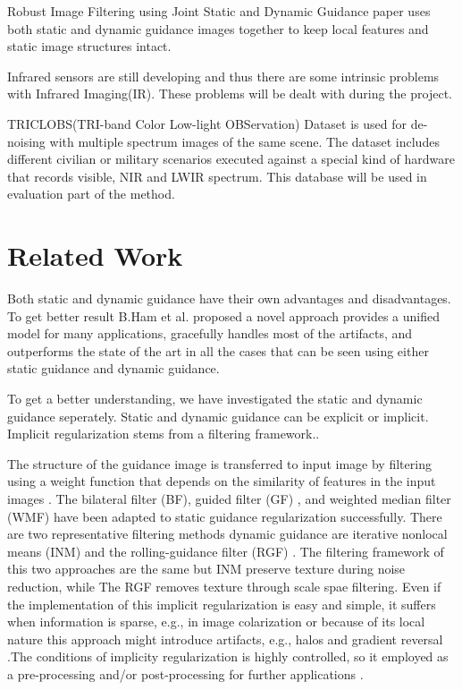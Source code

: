 \documentclass[10pt,twocolumn,letterpaper]{article}
\begin{document}
Robust Image Filtering using Joint Static and Dynamic Guidance\cite{ham2015} paper uses both static and dynamic guidance images together to keep local features and static image structures intact.

Infrared sensors are still developing and thus there are some intrinsic problems with Infrared Imaging(IR). These problems will be dealt with during the project.

TRICLOBS(TRI-band Color Low-light OBServation) Dataset\cite{triclobs} is used for de-noising with multiple spectrum images of the same scene. The dataset includes different civilian or military scenarios executed against a special kind of hardware that records visible, NIR and LWIR spectrum. This database will be used in evaluation part of the method\cite{ham2015}.

\section{Related Work}
Both static and dynamic guidance have their own advantages and disadvantages. To get better result B.Ham et al.\cite{ham2015} proposed a novel approach provides a unified model for many applications, gracefully handles most of the artifacts, and outperforms the state of the art in all the cases that can be seen using either static guidance and dynamic guidance.

To get a better understanding, we have investigated\textsl{} the static and dynamic guidance seperately. Static and dynamic guidance can be explicit or implicit. Implicit regularization stems from a filtering framework.\cite{ham2015}. 

The structure of the guidance image is transferred to input image by filtering using a weight function that depends on the similarity of features in the input images \cite{Kopf:2007:JBU:1275808.1276497}. The bilateral filter (BF)\cite{tomasi1998bilateral}, guided filter (GF) \cite{he2013guided}, and weighted median filter (WMF) \cite{ma2013constant} have been adapted to static guidance regularization successfully. There are two representative filtering methods dynamic
guidance are iterative nonlocal means (INM)  \cite{brox2008efficient} and the rolling-guidance filter (RGF) \cite{ham2015robust}. The filtering framework of this two approaches are the same but INM preserve texture during noise reduction, while The RGF removes texture through scale spae filtering. Even if the implementation of this implicit regularization is easy and simple, it suffers  when information is sparse, e.g., in image colarization \cite{levin2004colorization} or because of its local nature this approach might introduce artifacts, e.g., halos and gradient reversal  \cite{he2013guided}.The conditions  of implicity regularization is highly controlled, so it employed as a pre-processing and/or post-processing for further applications \cite{lang2012practical,ma2013constant}. 
\end{document}
